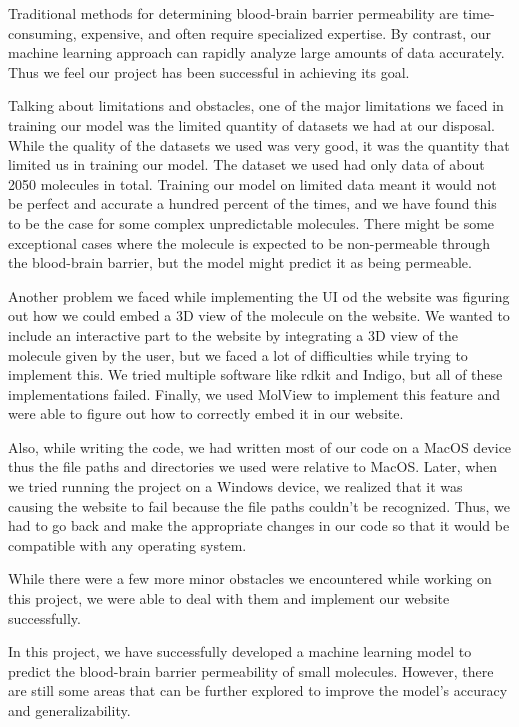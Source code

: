 \documentclass[fontsize=11pt]{article}
\begin{document}
Traditional methods for determining blood-brain barrier permeability are time-consuming, expensive, and often require specialized expertise. By contrast, our machine learning approach can rapidly analyze large amounts of data accurately. Thus we feel our project has been successful in achieving its goal.

Talking about limitations and obstacles, one of the major limitations we faced in training our model was the limited quantity of datasets we had at our disposal. While the quality of the datasets we used was very good, it was the quantity that limited us in training our model. The dataset we used had only data of about 2050 molecules in total. Training our model on limited data meant it would not be perfect and accurate a hundred percent of the times, and we have found this to be the case for some complex unpredictable molecules. There might be some exceptional cases where the molecule is expected to be non-permeable through the blood-brain barrier, but the model might predict it as being permeable. 

Another problem we faced while implementing the UI od the website was figuring out how we could embed a 3D view of the molecule on the website. We wanted to include an interactive part to the website by integrating a 3D view of the molecule given by the user, but we faced a lot of difficulties while trying to implement this. We tried multiple software like rdkit and Indigo, but all of these implementations failed. Finally, we used MolView to implement this feature and were able to figure out how to correctly embed it in our website.

Also, while writing the code, we had written most of our code on a MacOS device thus the file paths and directories we used were relative to MacOS. Later, when we tried running the project on a Windows device, we realized that it was causing the website to fail because the file paths couldn’t be recognized. Thus, we had to go back and make the appropriate changes in our code so that it would be compatible with any operating system.

While there were a few more minor obstacles we encountered while working on this project, we were able to deal with them and implement our website successfully. 

In this project, we have successfully developed a machine learning model to predict the blood-brain barrier permeability of small molecules. However, there are still some areas that can be further explored to improve the model's accuracy and generalizability.
\end{document}
